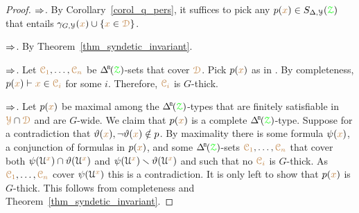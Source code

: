 \begin{proof}
  $\Rightarrow$.
  By Corollary~\ref{corol_q_pers}, it suffices to pick any $p({\color{brown} x})\in S_{\Delta,\EuScript Y}({\color{green}\EuScript Z})$ that entails $\gamma_{G,\EuScript Y}({\color{brown} x})\cup\{{\color{brown} x}\in{\color{brown}\EuScript D}\}$.

  $\Rightarrow$.
  By Theorem~\ref{thm_syndetic_invariant}.

  $\Rightarrow$.
  Let ${\color{brown}\EuScript C_1},\dots,{\color{brown}\EuScript C_n}$ be $\BDelta({\grZ})$-sets that cover ${\color{brown}\EuScript D}$.
  Pick $p({\color{brown} x})$ as in .
  By completeness, $p({\color{brown} x})\vdash {\color{brown}x}\in{\color{brown}\EuScript C_i}$ for some $i$.
  Therefore, ${\color{brown}\EuScript C_i}$ is $G$-thick.

  $\Rightarrow$.
  Let $p({\color{brown} x})$ be maximal among the $\BDelta({\grZ})$-types that are finitely satisfiable in ${\color{brown}\EuScript Y}\cap{\color{brown}\EuScript D}$ and are $G$-wide.
  We claim that $p({\color{brown} x})$ is a complete $\BDelta({\grZ})$-type.
  Suppose for a contradiction that $\vartheta({\color{brown} x}),\neg\vartheta({\color{brown} x})\notin p$.
  By maximality there is some formula $\psi({\color{brown} x})$, a conjunction of formulas in $p({\color{brown} x})$, and some $\BDelta({\grZ})$-sets ${\color{brown}\EuScript C_1},\dots,{\color{brown}\EuScript C_n}$ that cover both $\psi(\EuScript U^{\color{brown} x})\cap\vartheta(\EuScript U^{\color{brown} x})$ and $\psi(\EuScript U^{\color{brown} x})\smallsetminus\vartheta(\EuScript U^{\color{brown} x})$ and such that no ${\color{brown}\EuScript C_i}$ is $G$-thick.
  As ${\color{brown}\EuScript C_1},\dots,{\color{brown}\EuScript C_n}$ cover $\psi(\EuScript U^{\color{brown} x})$ this is a contradiction.
  It is only left to show that $p({\color{brown} x})$ is $G$-thick.
  This follows from completeness and Theorem~\ref{thm_syndetic_invariant}.
\end{proof}




